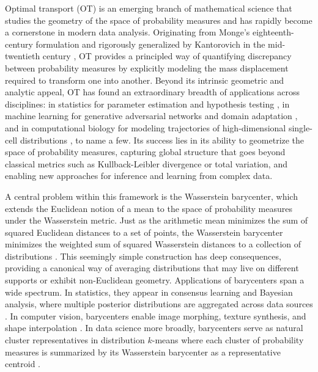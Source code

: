\documentclass[11pt]{article}
\begin{document}
Optimal transport (OT) is an emerging branch of mathematical science that studies the geometry of the space of probability measures and has rapidly become a cornerstone in modern data analysis. Originating from Monge's eighteenth-century formulation \citep{monge_1781_MemoireTheorieDeblais} and rigorously generalized by Kantorovich in the mid-twentieth century \citep{kantorovitch_1958_TranslocationMasses}, OT provides a principled way of quantifying discrepancy between probability measures by explicitly modeling the mass displacement required to transform one into another. Beyond its intrinsic geometric and analytic appeal, OT has found an extraordinary breadth of applications across disciplines: in statistics for parameter estimation \citep{bernton_2019_ParameterEstimationWasserstein} and hypothesis testing \citep{ramdas_2017_WassersteinTwoSampleTesting}, in machine learning for generative adversarial networks \citep{arjovsky_2017_WassersteinGenerativeAdversarial} and domain adaptation \citep{courty_2017_OptimalTransportDomain}, and in computational biology for modeling trajectories of high-dimensional single-cell distributions \citep{schiebinger_2019_OptimalTransportAnalysisSingleCell}, to name a few. Its success lies in its ability to geometrize the space of probability measures, capturing global structure that goes beyond classical metrics such as Kullback-Leibler divergence or total variation, and enabling new approaches for inference and learning from complex data.


A central problem within this framework is the Wasserstein barycenter, which extends the Euclidean notion of a mean to the space of probability measures under the Wasserstein metric. Just as the arithmetic mean minimizes the sum of squared Euclidean distances to a set of points, the Wasserstein barycenter minimizes the weighted sum of squared Wasserstein distances to a collection of distributions \citep{agueh_2011_BarycentersWassersteinSpace}. This seemingly simple construction has deep consequences, providing a canonical way of averaging distributions that may live on different supports or exhibit non-Euclidean geometry. Applications of barycenters span a wide spectrum. In statistics, they appear in consensus learning and Bayesian analysis, where multiple posterior distributions are aggregated across data sources \citep{srivastava_2018_ScalableBayesBarycenter}. In computer vision, barycenters enable image morphing, texture synthesis, and shape interpolation \citep{solomon_2015_ConvolutionalWassersteinDistances}. In data science more broadly, barycenters serve as natural cluster representatives in distribution $k$-means where each cluster of probability measures is summarized by its Wasserstein barycenter as a representative centroid \citep{zhuang_2022_WassersteinKmeansClustering}.
\end{document}
